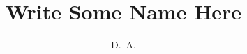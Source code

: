 \documentclass[defaultstyle,11pt]{thesis}
\title{Write Some Name Here}
\author{D.~A.}{McGough}
\begin{document}
 







\nocite{*}		%

\appendix


\end{document}
